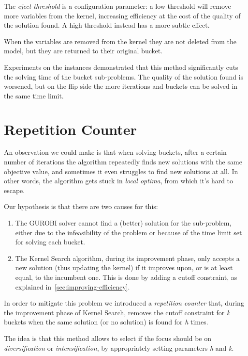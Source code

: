 The \textit{eject threshold} is a configuration parameter:
a low threshold will remove more variables from the kernel, increasing efficiency at the cost of the quality of the
solution found.
A high threshold instead has a more subtle effect.

When the variables are removed from the kernel they are not deleted from the model,
but they are returned to their original bucket.

Experiments on the instances demonstrated that this method significantly cuts
the solving time of the bucket sub-problems.
The quality of the solution found is worsened, but on the flip side
the more iterations and buckets can be solved in the same time limit.


\section{Repetition Counter}
An observation we could make is that when solving buckets,
after a certain number of iterations the algorithm
repeatedly finds new solutions with the same objective value,
and sometimes it even struggles to find new solutions at all.
In other words, the algorithm gets stuck in \textit{local optima},
from which it's hard to escape.

Our hypothesis is that there are two causes for this:
\begin{enumerate}
    \item The GUROBI solver cannot find a (better) solution for the sub-problem,
    either due to the infeasibility of the problem or because of
    the time limit set for solving each bucket.
    \item The Kernel Search algorithm, during its improvement phase,
    only accepts a new solution (thus updating the kernel)
    if it improves upon, or is at least equal, to the incumbent one.
    This is done by adding a cutoff constraint, as explained in~\ref{sec:improving-efficiency}.
\end{enumerate}

In order to mitigate this problem we introduced a \textit{repetition counter}
that, during the improvement phase of Kernel Search,
removes the cutoff constraint for \textit{k} buckets
when the same solution (or no solution) is found for \textit{h} times.

The idea is that this method allows to select if the focus should be on
\textit{diversification} or \textit{intensification},
by appropriately setting parameters \textit{h} and \textit{k}.

